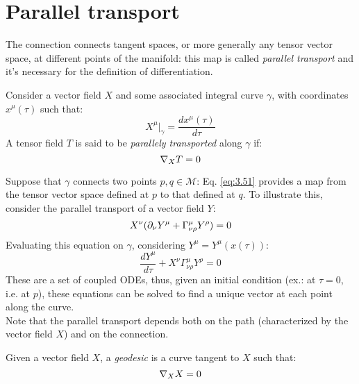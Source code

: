 \section{Parallel transport}

The connection connects tangent spaces, or more generally any tensor vector space, at different points of the manifold: this map is called \textit{parallel transport} and it's necessary for the definition of differentiation.

\begin{definition}
  Consider a vector field $ X $ and some associated integral curve $ \gamma $, with coordinates $ x^\mu(\tau) $ such that:
  \begin{equation*}
    X^\mu \big\vert_\gamma = \frac{dx^\mu(\tau)}{d\tau}
  \end{equation*}
  A tensor field $ T $ is said to be \textit{parallely transported} along $ \gamma $ if:
  \begin{equation}
    \nabla_X T = 0
    \label{eq:3.51}
  \end{equation}
\end{definition}

Suppose that $ \gamma $ connects two points $ p,q \in \mathcal{M} $: Eq. \ref{eq:3.51} provides a map from the tensor vector space defined at $ p $ to that defined at $ q $. To illustrate this, consider the parallel transport of a vector field $ Y $:
\begin{equation*}
  X^\nu (\partial_\nu Y^\mu + \Gamma^\mu_{\nu \rho} Y^\rho) = 0
\end{equation*}
Evaluating this equation on $ \gamma $, considering $ Y^\mu = Y^\mu(x(\tau)) $:
\begin{equation}
  \frac{dY^\mu}{d\tau} + X^\nu \Gamma^\mu_{\nu \rho} Y^\rho = 0
  \label{eq:3.52}
\end{equation}
These are a set of coupled ODEs, thus, given an initial condition (ex.: at $ \tau = 0 $, i.e. at $ p $), these equations can be solved to find a unique vector at each point along the curve.\\
Note that the parallel transport depends both on the path (characterized by the vector field $ X $) and on the connection.

\begin{definition}
  Given a vector field $ X $, a \textit{geodesic} is a curve tangent to $ X $ such that:
  \begin{equation}
    \nabla_X X = 0
    \label{eq:3.53}
  \end{equation}
\end{definition}

